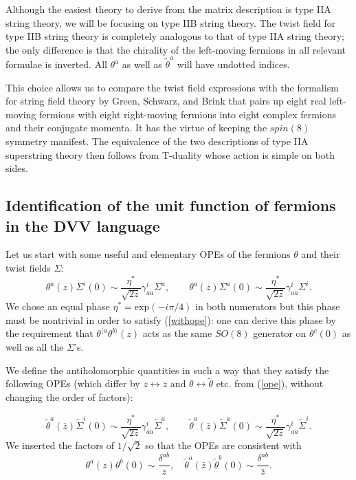 \documentclass[nohyper,12pt,letterpaper]{JHEP3}
\def \tilde{\widetilde}
\def \exp{\mbox{exp}}
\def \eqn#1#2{\begin{equation}#2\label{#1}\end{equation}}
\begin{document}
Although the easiest theory to derive from the matrix description is
type IIA string theory, we will be focusing on type IIB string
theory. The twist field for type IIB string theory is completely
analogous to that of type IIA string theory; the only difference is
that the chirality of the left-moving fermions in all relevant
formulae is inverted. All $\theta^a$ as well as $\tilde\theta^a$ will
have undotted indices.

This choice allows us to compare the twist field expressions with
the formalism for string field theory by Green, Schwarz, and Brink
\cite{brinkgs} that pairs up eight real left-moving fermions with eight
right-moving fermions into eight complex fermions and their conjugate 
momenta. It has the virtue of keeping the $spin(8)$ symmetry manifest.
The equivalence of the two descriptions of type IIA superstring theory 
then follows from T-duality whose action is simple on both sides.





\subsection{Identification of the unit function of fermions in the DVV 
language}

Let us start with some useful and elementary OPEs of the fermions
$\theta$ and their twist fields $\Sigma$:
\eqn{ope}{\theta^a(z)\Sigma^i(0)\sim \frac{\eta^*}{\sqrt{2z}}
\gamma^{i}_{a\dot a} \Sigma^{\dot a},
\qquad
\theta^a(z)\Sigma^{\dot a}(0)\sim \frac{\eta^*}{\sqrt{2z}}
\gamma^{i}_{a\dot a} \Sigma^{i}.}
%
We chose an equal phase $\eta^*=\exp(-i\pi/4)$ in both numerators but this phase
must be nontrivial in order to satisfy (\ref{withope}): one can derive this phase
by the requirement that $\theta^{\langle a}\theta^{b\rangle}(z)$ acts as the same
$SO(8)$ generator on $\theta^c(0)$ as well as all the $\Sigma$'s.

We define the antiholomorphic quantities in such a way that they satisfy 
the following OPEs (which differ by $z\leftrightarrow \bar z$
and $\theta\leftrightarrow \tilde \theta$ etc. from (\ref{ope}), without
changing the order of factors):

\eqn{opetwo}{\tilde\theta^a(\bar z)\tilde\Sigma^i(0)\sim 
\frac{\eta^*}{\sqrt{2\bar z}}
\gamma^{i}_{a\dot a} \tilde \Sigma^{\dot a},
\qquad
\tilde\theta^a(\bar z)\tilde\Sigma^{\dot a}(0)\sim \frac{\eta^*}{\sqrt{2z}}
\gamma^{i}_{a\dot a} \tilde\Sigma^{i}.}
We inserted the factors of $1/ \sqrt{2}$ so that the OPEs are consistent 
with
\eqn{withope}{\theta^{a}(z)\theta^{b}(0)\sim \frac{\delta^{ab}}{z},
\quad
\tilde \theta^{a}(\bar z)\tilde\theta^{b}(0)\sim \frac{\delta^{ab}}{\bar 
z}.}
\end{document}
